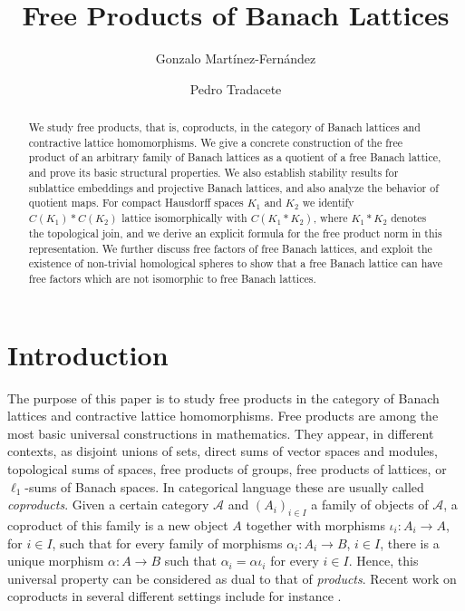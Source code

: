 \documentclass[12pt]{amsart}
\title{Free Products of Banach Lattices}
\author[G. Mart\'inez-Fern\'andez]{Gonzalo Mart\'inez-Fern\'andez}
\author[P. Tradacete]{Pedro Tradacete}
\date{}
\theoremstyle{plain}
\theoremstyle{definition}
\begin{document}
\begin{abstract}
We study free products, that is, coproducts, in the category of Banach lattices and contractive lattice homomorphisms. We give a concrete construction of the free product of an arbitrary family of Banach lattices as a quotient of a free Banach lattice, and prove its basic structural properties. We also establish stability results for sublattice embeddings and projective Banach lattices, and also analyze the behavior of quotient maps. For compact Hausdorff spaces $K_1$ and $K_2$ we identify $C(K_1)\ast C(K_2)$ lattice isomorphically with $C(K_1\ast K_2)$, where $K_1\ast K_2$ denotes the topological join, and we derive an explicit formula for the free product norm in this representation. We further discuss free factors of free Banach lattices, and exploit the existence of non-trivial homological spheres to show that a free Banach lattice can have free factors which are not isomorphic to free Banach lattices.
\end{abstract}




\maketitle

\section{Introduction}

The purpose of this paper is to study free products in the category of Banach lattices and contractive lattice homomorphisms. Free products are among the most basic universal constructions in mathematics. They appear, in different contexts, as disjoint unions of sets, direct sums of vector spaces and modules, topological sums of spaces, free products of groups, free products of lattices, or $\ell_1$-sums of Banach spaces. In categorical language these are usually called \emph{coproducts}. Given a certain category $\mathcal{A}$ and $(A_i)_{i\in I}$ a family of objects of $\mathcal{A}$, a coproduct of this family is a new object $A$ together with morphisms $\iota_i:A_i \rightarrow A$, for $i\in I$, such that for every family of morphisms $\alpha_i:A_i\rightarrow B$, $i\in I$, there is a unique morphism $\alpha:A\rightarrow B$ such that $\alpha_i=\alpha\iota_i$ for every $i\in I$. Hence, this universal property can be considered as dual to that of \emph{products}. Recent work on coproducts in several different settings include for instance \cite{Carai2026Godel, Chatzinikolaou2023OperatorASystems, Chirvasitu2022Dearth, GluesingLuerssenJany2023QMatroids, HerfortHofmannRusso2024ProLie, IoanaSpaasVigdorovich2025TraceSpaces, Kavruk2014Nuclearity}.
\end{document}
